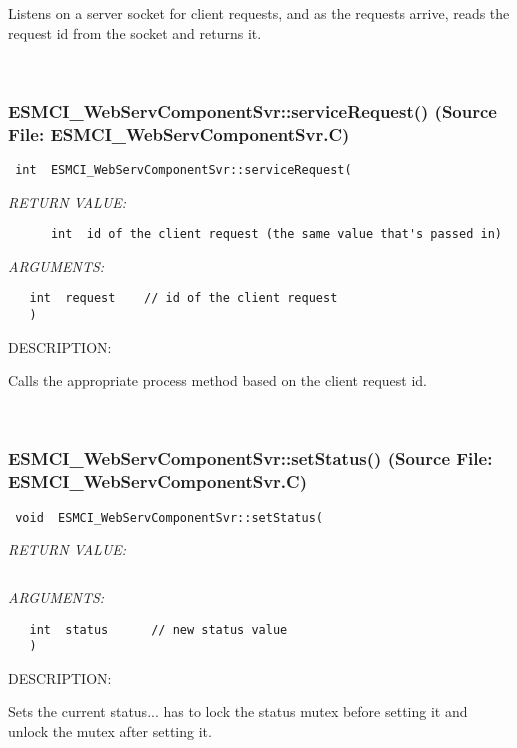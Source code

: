      Listens on a server socket for client requests, and as the requests
      arrive, reads the request id from the socket and returns it.
   
 
\mbox{}\hrulefill\
 
\subsubsection{ESMCI\_WebServComponentSvr::serviceRequest() (Source File: ESMCI\_WebServComponentSvr.C)}


  
\begin{verbatim} int  ESMCI_WebServComponentSvr::serviceRequest(\end{verbatim}{\em RETURN VALUE:}
\begin{verbatim}      int  id of the client request (the same value that's passed in)\end{verbatim}{\em ARGUMENTS:}
\begin{verbatim}   int  request    // id of the client request
   )\end{verbatim}
{\sf DESCRIPTION:\\ }


      Calls the appropriate process method based on the client request id.
   
 
\mbox{}\hrulefill\
 
\subsubsection{ESMCI\_WebServComponentSvr::setStatus() (Source File: ESMCI\_WebServComponentSvr.C)}


  
\begin{verbatim} void  ESMCI_WebServComponentSvr::setStatus(\end{verbatim}{\em RETURN VALUE:}
\begin{verbatim} \end{verbatim}{\em ARGUMENTS:}
\begin{verbatim}   int  status      // new status value
   )\end{verbatim}
{\sf DESCRIPTION:\\ }


      Sets the current status... has to lock the status mutex before setting
      it and unlock the mutex after setting it.
   
